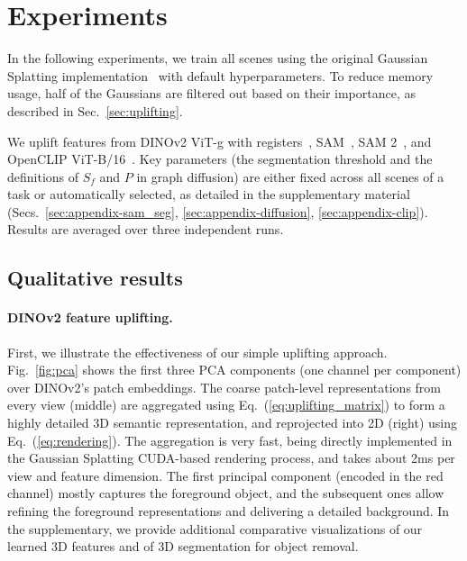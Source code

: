 \section{Experiments}
\label{sec:exp}

In the following experiments, we train all scenes using the original Gaussian Splatting implementation~\citep{kerbl2023gaussiansplatting} with default hyperparameters. To reduce memory usage, half of the Gaussians are filtered out based on their importance, as described in Sec.~\ref{sec:uplifting}.

We uplift features from DINOv2 ViT-g with registers~\citep{darcet2024registers}, SAM~\citep{kirillov2023sam}, SAM 2~\citep{ravi2024sam2}, and OpenCLIP ViT-B/16~\citep{ilharco2021openclip}.
%
Key parameters (\eg the segmentation threshold and the definitions of $S_f$ and $P$ in graph diffusion) are either fixed across all scenes of a task or automatically selected, as detailed in the supplementary material (Secs.~\ref{sec:appendix-sam_seg},  \ref{sec:appendix-diffusion}, \ref{sec:appendix-clip}).
Results are averaged over three independent runs.

\subsection{Qualitative results}

\paragraph{DINOv2 feature uplifting.}
First, we illustrate the effectiveness of our simple uplifting approach. Fig.~\ref{fig:pca} shows the first three PCA components (one channel per component) over DINOv2's patch embeddings. The coarse patch-level representations from every view (middle) are aggregated using Eq.~(\ref{eq:uplifting_matrix}) to form a highly detailed 3D semantic representation, and reprojected into 2D (right) using Eq.~(\ref{eq:rendering}). The aggregation is very fast, being directly implemented in the Gaussian Splatting CUDA-based rendering process, and takes about 2ms per view and feature dimension. The first principal component (encoded in the red channel) mostly captures the foreground object, and the subsequent ones allow refining the foreground representations and delivering a detailed background.
In the supplementary, we provide additional comparative visualizations of our learned 3D features %
and of 3D segmentation for object removal. %

